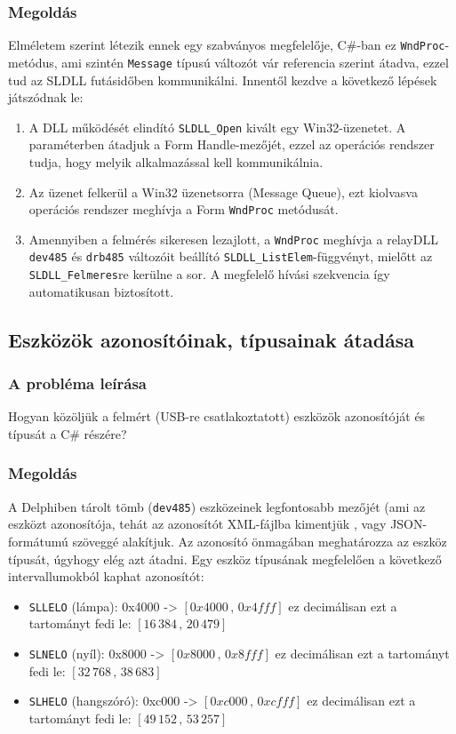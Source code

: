 \documentclass[tocnopagenum]{thesis-ekf}
\begin{document}
	\subsubsection{Megoldás}
	\label{wndproc}
	Elméletem szerint létezik ennek egy szabványos megfelelője, C\#-ban ez \verb*|WndProc|-metódus, ami szintén \verb*|Message| típusú változót vár referencia szerint átadva, ezzel tud az SLDLL futásidőben kommunikálni.
	Innentől kezdve a következő lépések játszódnak le:
	\begin{enumerate}
		\item A DLL működését elindító \verb*|SLDLL_Open| kivált egy Win32-üzenetet. A paraméterben átadjuk a Form Handle-mezőjét, ezzel az operációs rendszer tudja, hogy melyik alkalmazással kell kommunikálnia.
		\item Az üzenet felkerül a Win32 üzenetsorra (Message Queue), ezt kiolvasva operációs rendszer meghívja a Form \verb*|WndProc| metódusát.
		\item Amennyiben a felmérés sikeresen lezajlott, a \verb*|WndProc| meghívja a relayDLL \verb*|dev485| és \verb*|drb485| változóit beállító \verb*|SLDLL_ListElem|-függvényt, mielőtt az \verb*|SLDLL_Felmeres|re kerülne a sor. A megfelelő hívási szekvencia így automatikusan biztosított.
	\end{enumerate}
	\subsection{Eszközök azonosítóinak, típusainak átadása}
	\subsubsection{A probléma leírása} Hogyan közöljük a felmért (USB-re csatlakoztatott) eszközök azonosítóját és típusát a C\# részére?
	\subsubsection{Megoldás}
	A Delphiben tárolt tömb (\verb*|dev485|) eszközeinek legfontosabb mezőjét (ami az eszközt azonosítója, tehát az azonosítót XML-fájlba kimentjük \cite{sof_xmlcreate}, vagy JSON-formátumú szöveggé alakítjuk. Az azonosító önmagában meghatározza az eszköz típusát, úgyhogy elég azt átadni.
	Egy eszköz típusának megfelelően a következő intervallumokból kaphat azonosítót:
	\begin{itemize}
		\item \verb*|SLLELO| (lámpa): 0x4000 -> $[0x4000\,,\,0x4fff]$ ez decimálisan ezt a tartományt fedi le: $[16\,384\,,\,20\,479]$
		\item \verb*|SLNELO| (nyíl): 0x8000 -> $[0x8000\,,\,0x8fff]$ ez decimálisan ezt a tartományt fedi le: $[32\,768\,,\,38\,683]$
		\item \verb*|SLHELO| (hangszóró): 0xc000 -> $[0xc000\,,\,0xcfff]$ ez decimálisan ezt a tartományt fedi le: $[49\,152\,,\,53\,257]$
	\end{itemize}
	
\end{document}
